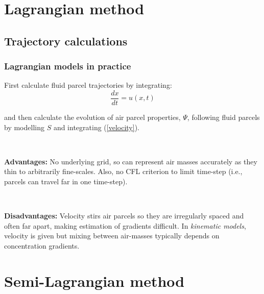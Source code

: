 \documentclass[xcolor=dvipsnames]{beamer} %
\newcommand{\BSS}{ \begin{scriptsize}}
\newcommand{\ESS}{ \end{scriptsize}}
\begin{document}
\section{Lagrangian method}
\subsection{Trajectory calculations}
\frame
{
	\frametitle{Lagrangian models in practice}
	\BSS
\setcounter{equation}{2}	
	First calculate fluid parcel trajectories by
	integrating:
	\begin{equation}
	\frac{{d x}}{d t}={ u}({ x},t)
	\label{velocity}	
	\end{equation}
	
	and then calculate the evolution of air parcel properties, $\Psi$,
	following fluid parcels by modelling $S$ and integrating
	(\ref{velocity}).
	
	~
	
	{\bf Advantages:} No underlying grid, so can represent air masses
	accurately as they thin to arbitrarily fine-scales. Also, no CFL
	criterion to limit time-step (i.e., parcels can travel far in one
	time-step).
	
	~
	
	{\bf Disadvantages:} Velocity stirs air parcels so they are
	irregularly spaced and often far apart, making estimation of gradients
	difficult. In {\em kinematic models}, velocity is given but mixing
	between air-masses typically depends on concentration gradients. 
	
	\ESS
}

\section{Semi-Lagrangian method}
\end{document}
